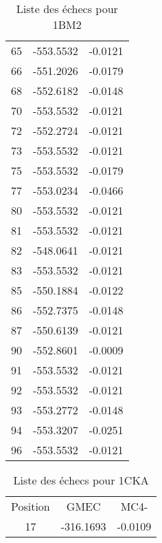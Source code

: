 \begin{table}[h]
\begin{tabular}{ccc}
        65 & -553.5532 & -0.0121 \\
        66 & -551.2026 & -0.0179 \\
        68 & -552.6182 & -0.0148 \\
        70 & -553.5532 & -0.0121 \\
        72 & -552.2724 & -0.0121 \\
        73 & -553.5532 & -0.0121 \\
        75 & -553.5532 & -0.0179 \\
        77 & -553.0234 & -0.0466 \\
        80 & -553.5532 & -0.0121 \\
        81 & -553.5532 & -0.0121 \\
        82 & -548.0641 & -0.0121 \\
        83 & -553.5532 & -0.0121 \\
        85 & -550.1884 & -0.0122 \\
        86 & -552.7375 & -0.0148 \\
        87 & -550.6139 & -0.0121 \\
        90 & -552.8601 & -0.0009 \\
        91 & -553.5532 & -0.0121 \\
        92 & -553.5532 & -0.0121 \\
        93 & -553.2772 & -0.0148 \\
        94 & -553.3207 & -0.0251 \\
        96 & -553.5532 & -0.0121 \\
        \bottomrule

      \end{tabular}      
      \caption{Liste des échecs pour 1BM2}
\label{tab:result_1_active_1BM2}      
    \end{table}




    \begin{table}[h]
      \centering

      \begin{tabular}{ccc}


        \toprule
        Position & GMEC & MC4- \\
        \cmidrule{1-3}
        17 & -316.1693 & -0.0109 \\

        \bottomrule
      \end{tabular}      
      \caption{Liste des échecs pour 1CKA}
\label{tab:result_1_active_1CKA}      
    \end{table}


